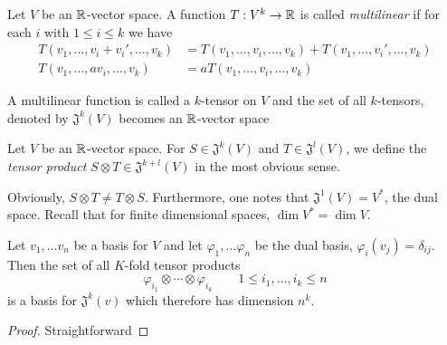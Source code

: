 \begin{definition}[Tensor]
    Let $V$ be an $\mathbb{R}$-vector space. A function $T:V^k\to\mathbb{R}$ is called \textit{multilinear} if for each $i$ with $1\le i\le k$ we have 
    \begin{align*}
        T(v_1,\ldots,v_i + v_i',\ldots,v_k) &= T(v_1,\ldots,v_i,\ldots,v_k) + T(v_1,\ldots,v_i',\ldots, v_k)\\
        T(v_1,\ldots,av_i,\ldots,v_k) &= aT(v_1,\ldots,v_i,\ldots,v_k)
    \end{align*}

    A multilinear function is called a $k$-tensor on $V$ and the set of all $k$-tensors, denoted by $\mathfrak{J}^k(V)$ becomes an $\mathbb{R}$-vector space
\end{definition}

\begin{definition}
    Let $V$ be an $\mathbb{R}$-vector space. For $S\in\mathfrak{J}^k(V)$ and $T\in\mathfrak{J}^l(V)$, we define the \textit{tensor product} $S\otimes T\in\mathfrak{J}^{k + l}(V)$ in the most obvious sense.
\end{definition}

Obviously, $S\otimes T\ne T\otimes S$. Furthermore, one notes that $\mathfrak{J}^1(V) = V^*$, the dual space. Recall that for finite dimensional spaces, $\dim V^* = \dim V$.

\begin{theorem}
    Let $v_1,\ldots v_n$ be a basis for $V$ and let $\varphi_1,\ldots\varphi_n$ be the dual basis, $\varphi_i(v_j) = \delta_{ij}$. Then the set of all $K$-fold tensor products 
    \begin{equation*}
        \varphi_{i_1}\otimes\cdots\otimes\varphi_{i_k}\qquad 1\le i_1,\ldots,i_k\le n
    \end{equation*}
    is a basis for $\mathfrak{J}^k(v)$ which therefore has dimension $n^k$.
\end{theorem}
\begin{proof}
    Straightforward
\end{proof}

